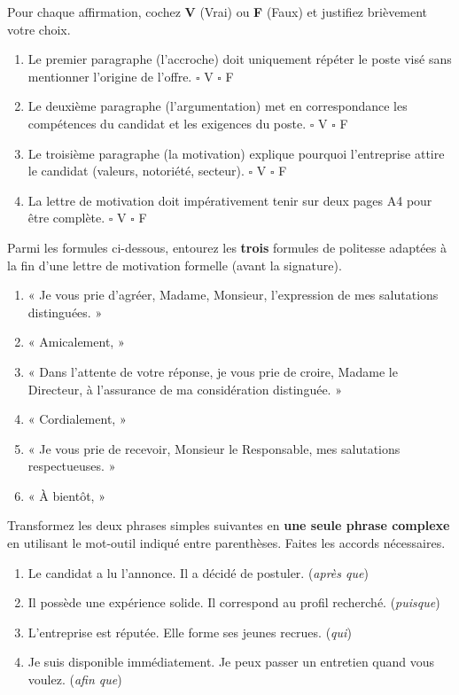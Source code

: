 \documentclass[11pt]{article}
\begin{document}
\begin{exercice}
Pour chaque affirmation, cochez \textbf{V} (Vrai) ou \textbf{F} (Faux) et justifiez brièvement votre choix.

\begin{enumerate}
\item Le premier paragraphe (l'accroche) doit uniquement répéter le poste visé sans mentionner l'origine de l'offre. \hfill $\square$ V \quad $\square$ F
\item Le deuxième paragraphe (l'argumentation) met en correspondance les compétences du candidat et les exigences du poste. \hfill $\square$ V \quad $\square$ F
\item Le troisième paragraphe (la motivation) explique pourquoi l'entreprise attire le candidat (valeurs, notoriété, secteur). \hfill $\square$ V \quad $\square$ F
\item La lettre de motivation doit impérativement tenir sur deux pages A4 pour être complète. \hfill $\square$ V \quad $\square$ F
\end{enumerate}
\end{exercice}

\begin{exercice}
Parmi les formules ci-dessous, entourez les \textbf{trois} formules de politesse adaptées à la fin d'une lettre de motivation formelle (avant la signature).

\begin{enumerate}
\item « Je vous prie d'agréer, Madame, Monsieur, l'expression de mes salutations distinguées. »
\item « Amicalement, »
\item « Dans l'attente de votre réponse, je vous prie de croire, Madame le Directeur, à l'assurance de ma considération distinguée. »
\item « Cordialement, »
\item « Je vous prie de recevoir, Monsieur le Responsable, mes salutations respectueuses. »
\item « À bientôt, »
\end{enumerate}
\end{exercice}

\begin{exercice}
Transformez les deux phrases simples suivantes en \textbf{une seule phrase complexe} en utilisant le mot-outil indiqué entre parenthèses. Faites les accords nécessaires.

\begin{enumerate}
\item Le candidat a lu l'annonce. Il a décidé de postuler. (\textit{après que})
\item Il possède une expérience solide. Il correspond au profil recherché. (\textit{puisque})
\item L'entreprise est réputée. Elle forme ses jeunes recrues. (\textit{qui})
\item Je suis disponible immédiatement. Je peux passer un entretien quand vous voulez. (\textit{afin que})
\end{enumerate}
\end{exercice}
\end{document}
